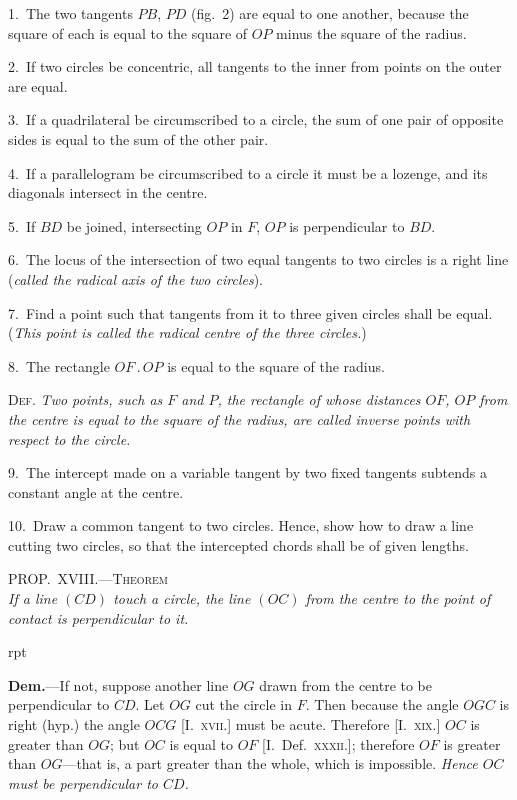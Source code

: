 \documentclass[oneside]{book}
\newcommand\myprop[2]{
\bigskip\Needspace*{4\baselineskip}\begin{center}\textsc{#1}\\\medskip\emph{#2}\par\end{center}
}
\newcommand\imgflow[3]{
\setcounter{wrapwidth}{#1}
\begin{wrapfigure}[#2]{r}{\value{wrapwidth}pt}
\begin{center}
\vspace{-0.3in}
\end{center}
\end{wrapfigure}
}
\begin{document}
\begin{footnotesize}
1.~The two tangents $PB$, $PD$ (fig.~2) are equal to one another,
because the square of each is equal to the square of $OP$ minus the
square of the radius.

2.~If two circles be concentric, all tangents to the inner from
points on the outer are equal.

3.~If a quadrilateral be circumscribed to a circle, the sum
of one pair of opposite sides is equal to the sum of the other
pair.

4.~If a parallelogram be circumscribed to a circle it must be
a lozenge, and its diagonals intersect in the centre.

5.~If $BD$ be joined, intersecting $OP$ in $F$, $OP$ is perpendicular
to $BD$.

6.~The locus of the intersection of two equal tangents to two
circles is a right line (\emph{called the radical axis of the two circles}).

7.~Find a point such that tangents from it to three given circles
shall be equal. (\emph{This point is called the radical centre of the three
circles.})

8.~The rectangle $OF\,.\,OP$ is equal to the square of the radius.

\textsc{Def.} \emph{Two points, such as $F$ and $P$, the rectangle of whose
distances $OF$, $OP$ from the centre is equal to the square of the
radius, are called inverse points with respect to the circle.}

9.~The intercept made on a variable tangent by two fixed tangents
subtends a constant angle at the centre.

10.~Draw a common tangent to two circles. Hence, show how
to draw a line cutting two circles, so that the intercepted chords
shall be of given lengths.
\par\end{footnotesize}

\myprop{PROP\@.~XVIII\@.---Theorem}{If a line $(CD)$ touch a circle, the line $(OC)$ from the centre
to the point of contact is perpendicular to it.}

\imgflow{135}{11}{f124}

\textbf{Dem.}---If not, suppose another line $OG$ drawn from
the centre to be perpendicular
to $CD$. Let $OG$ cut the
circle in $F$. Then because
the angle $OGC$ is right (hyp.)
the angle $OCG$ [I.~\textsc{xvii.}]
must be acute. Therefore
[I.~\textsc{xix.}] $OC$ is greater than
$OG$; but $OC$ is equal to $OF$
[I.~Def.~\textsc{xxxii.}]; therefore
$OF$ is greater than $OG$---that
is, a part greater than the
whole, which is impossible. \emph{Hence $OC$ must be perpendicular
to $CD$.}\par\smallskip
\end{document}
